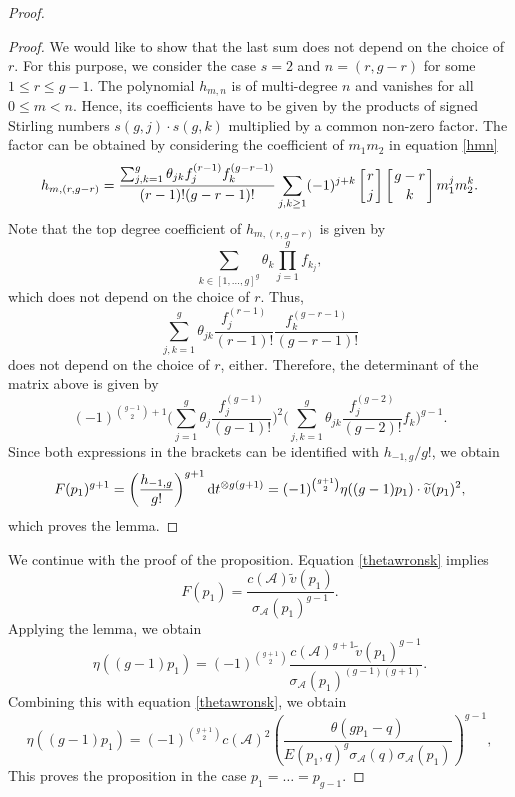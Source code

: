 \documentclass[pdftex]{sigma}
\numberwithin{equation}{section}
\newcommand\gf[2]{\genfrac{}{}{0pt}{}{#1}{#2}}
\begin{document}
\begin{proof}
\begin{proof}
		We would like to show that the last sum does not depend on the choice of $r$. For this purpose, we consider the case $s=2$ and $n=(r,g-r)$ for some $1\le r\le g-1$. The polynomial $h_{m,n}$ is of multi-degree $n$ and vanishes for all $0\le m<n$. Hence, its coefficients have to be given by the products of signed Stirling numbers $s(g,j)\cdot s(g,k)$ multiplied by a common non-zero factor. The factor can be obtained by considering the coefficient of $m_1 m_2$ in equation \eqref{hmn}
		\begin{align*}
			h_{m,(r,g-r)}=\frac{\sum_{j,k=1}^g\theta_{jk}f_j^{(r-1)}f_k^{(g-r-1)}}{(r-1)!(g-r-1)!}\sum_{j,k\ge 1}(-1)^{j+k}\left[\gf{r}{j}\right]\left[\gf{g-r}{k}\right]m_1^j m_2^k.
		\end{align*}
		Note that the top degree coefficient of $h_{m,(r,g-r)}$ is given by
		\[\sum_{k\in[1,\dots,g]^g}\theta_k\prod_{j=1}^g f_{k_j},\]
		which does not depend on the choice of $r$. Thus,
		\[\sum_{j,k=1}^g\theta_{jk}\frac{f_j^{(r-1)}}{(r-1)!}\frac{f_k^{(g-r-1)}}{(g-r-1)!}\]
		does not depend on the choice of $r$, either. Therefore, the determinant of the matrix above is given by
		\[(-1)^{\binom{g-1}{2}+1}\Biggl(\sum_{j=1}^g\theta_j\frac{f_j^{(g-1)}}{(g-1)!}\Biggr)^2\Biggl(\sum_{j,k=1}^g\theta_{jk}\frac{f_j^{(g-2)}}{(g-2)!}f_k\Biggr)^{g-1}.\]
		Since both expressions in the brackets can be identified with $h_{-1,g}/g!$, we obtain
		\[F(p_1)^{g+1}=\left(\frac{h_{-1,g}}{g!}\right)^{g+1}{\rm d}t^{\otimes g(g+1)}=(-1)^{\binom{g+1}{2}}\eta((g-1)p_1)\cdot\widetilde{v}(p_1)^2,\]
		which proves the lemma.
	\end{proof}

	We continue with the proof of the proposition. Equation \eqref{thetawronsk} implies
	\[F(p_1)=\frac{c(\mathcal{A})\widetilde{v}(p_1)}{\sigma_{\mathcal{A}}(p_1)^{g-1}}.\]
	Applying the lemma, we obtain
	\[\eta((g-1)p_1)=(-1)^{\binom{g+1}{2}}\frac{c(\mathcal{A})^{g+1}\widetilde{v}(p_1)^{g-1}}{\sigma_{\mathcal{A}}(p_1)^{(g-1)(g+1)}}.\]
	Combining this with equation \eqref{thetawronsk}, we obtain
	\[\eta((g-1)p_1)=(-1)^{\binom{g+1}{2}}c(\mathcal{A})^2\left(\frac{\theta(gp_1-q)}{E(p_1,q)^{g}\sigma_{\mathcal{A}}(q)\sigma_{\mathcal{A}}(p_1)}\right)^{g-1},\]
	This proves the proposition in the case $p_1=\dots=p_{g-1}$.
	

\end{proof}
\end{document}
